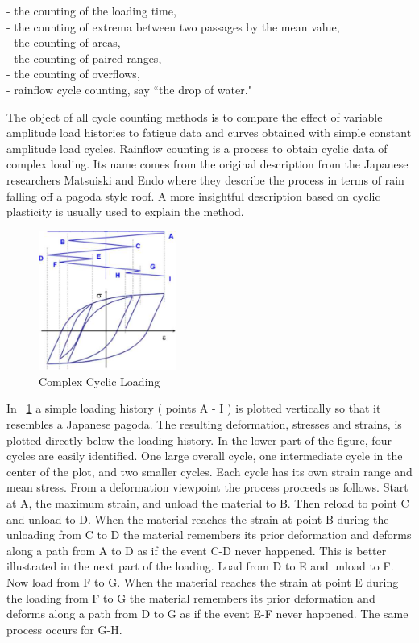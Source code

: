 \documentclass[3p,times,procedia,number]{elsarticle}
\newcommand{\figref}[1]{\figurename~\ref{#1}}
\begin{document}
\vspace{6pt}
\noindent
- the counting of the loading time,\\
- the counting of extrema between two passages by the mean value,\\
- the counting of areas,\\
- the counting of paired ranges,\\
- the counting of overflows,\\
- rainflow cycle counting, say ``the drop of water."
\vspace{6pt}

The object of all cycle counting methods is to compare the effect of variable amplitude load histories to fatigue data and curves obtained with simple constant amplitude load cycles. Rainflow counting is a process to obtain cyclic data of complex loading. Its name comes from the original description from the Japanese researchers Matsuiski and Endo where they describe the process in terms of rain falling off a pagoda style roof. A more insightful description based on cyclic plasticity is usually used to explain the method.

\begin{figure}[h!]
	\centering
	\includegraphics[width=0.4\textwidth]{figures//rainflow.jpg} 
	\caption{Complex Cyclic Loading}
	\label{rainflow}
\end{figure}

In \figref{rainflow} a simple loading history ( points A - I ) is plotted vertically so that it resembles a Japanese pagoda. The resulting deformation, stresses and strains, is plotted directly below the loading history. In the lower part of the figure, four cycles are easily identified. One large overall cycle, one intermediate cycle in the center of the plot, and two smaller cycles. Each cycle has its own strain range and mean stress. From a deformation viewpoint the process proceeds as follows. Start at A, the maximum strain, and unload the material to B. Then reload to point C and unload to D. When the material reaches the strain at point B during the unloading from C to D the material remembers its prior deformation and deforms along a path from A to D as if the event C-D never happened. This is better illustrated in the next part of the loading. Load from D to E and unload to F. Now load from F to G. When the material reaches the strain at point E during the loading from F to G the material remembers its prior deformation and deforms along a path from D to G as if the event E-F never happened. The same process occurs for G-H.
\end{document}
